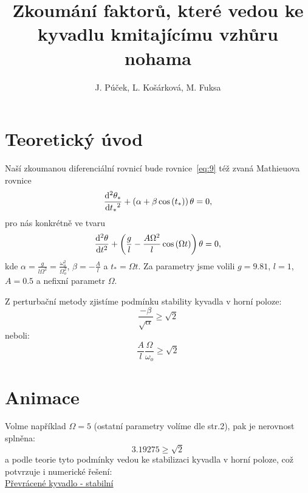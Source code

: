 \documentclass{beamer}
\title[Převrácené kyvadlo]{Zkoumání faktorů, které vedou ke kyvadlu kmitajícímu vzhůru nohama}
\author[J. P., L. K., M. F.]{J. Púček, L. Košárková, M. Fuksa}
\institute[Univerzita Karlova]{Univerzita Karlova, Česká republika}
\date{}
\begin{document}
\begin{frame}
\titlepage
\end{frame}

\section{Teoretický úvod}
\label{sec:uvod}

\begin{frame}
\begin{center}
			Naší zkoumanou diferenciální rovnicí bude rovnice~\eqref{eq:9} též zvaná Mathieuova rovnice
		\begin{equation}
			\label{eq:9}
			\frac{\mathrm{d}^2 {\theta_{*}}}{\mathrm{d} {t_{*}}^2}
			+
			\left(
			\alpha
			+
			\beta \cos \left( t_{*} \right)
			\right)
			\theta
			=
			0
			,
		\end{equation}
			pro nás konkrétně ve tvaru
		\begin{equation}
			\label{eq:10}
			\frac{\mathrm{d}^2 {\theta}}{\mathrm{d} {t}^2}
			+
			\left(
			\frac{g}{l}
			-
			\frac{A \Omega^2}{l} \cos \left( \Omega t \right)
			\right)
			\theta
			=
			0
			,
		\end{equation}
			kde $\alpha=\frac{g}{l\Omega^2}=\frac{\omega_{o}^2}{\Omega_{o}^2}$, $ \beta=-\frac{A}{l}$ a $t_{*}=\Omega t$. Za parametry jsme volili $g=9.81$, $l=1$,  $A=0.5$ a nefixní parametr $\Omega$.
		\end{center}
\end{frame}

\begin{frame}
	Z perturbační metody zjistíme podmínku stability kyvadla v horní poloze: 
	\begin{equation*}
		\frac{-\beta}{\sqrt{\alpha}}\geq \sqrt{2}
	\end{equation*}
	neboli:
	\begin{equation*}
	\frac{A}{l}\frac{\Omega}{\omega_{o}}\geq \sqrt{2}
	\end{equation*}	
\end{frame}

\section{Animace}
\label{sec:animace}

\begin{frame}
\begin{center}
	Volme například $\Omega=5$ (ostatní parametry volíme dle str.2), pak je nerovnost splněna:
\begin{equation*}
	3.19275 \geq \sqrt{2}
\end{equation*}	
	a podle teorie tyto podmínky vedou ke stabilizaci kyvadla v horní poloze, což potvrzuje i numerické řešení: 
\\

\href{run:./animace.mp4}{Převrácené kyvadlo - stabilní}
\end{center}
\end{frame}
\end{document}
